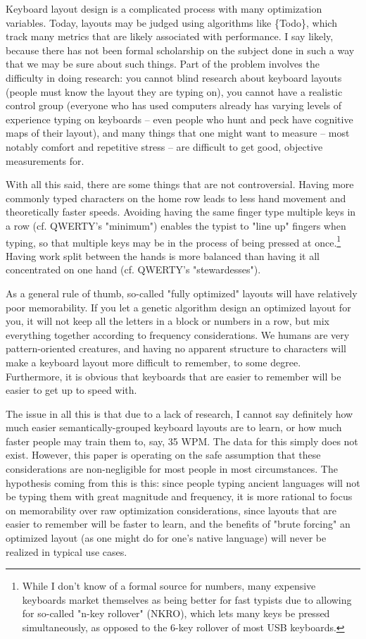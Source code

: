 \documentclass[11pt]{article}
\begin{document}
Keyboard layout design is a complicated process with many optimization variables. Today, layouts may be judged using algorithms like \{Todo\}, which track many metrics that are likely associated with performance. I say likely, because there has not been formal scholarship on the subject done in such a way that we may be sure about such things. Part of the problem involves the difficulty in doing research: you cannot blind research about keyboard layouts (people must know the layout they are typing on), you cannot have a realistic control group (everyone who has used computers already has varying levels of experience typing on keyboards -- even people who hunt and peck have cognitive maps of their layout), and many things that one might want to measure -- most notably comfort and repetitive stress -- are difficult to get good, objective measurements for.

With all this said, there are some things that are not controversial. Having more commonly typed characters on the home row leads to less hand movement and theoretically faster speeds. Avoiding having the same finger type multiple keys in a row (cf. QWERTY's "minimum") enables the typist to "line up" fingers when typing, so that multiple keys may be in the process of being pressed at once.\footnote{While I don't know of a formal source for numbers, many expensive keyboards market themselves as being better for fast typists due to allowing for so-called "n-key rollover" (NKRO), which lets many keys be pressed simultaneously, as opposed to the 6-key rollover of most USB keyboards.} Having work split between the hands is more balanced than having it all concentrated on one hand (cf. QWERTY's "stewardesses").

As a general rule of thumb, so-called "fully optimized" layouts will have relatively poor memorability. If you let a genetic algorithm design an optimized layout for you, it will not keep all the letters in a block or numbers in a row, but mix everything together according to frequency considerations. We humans are very pattern-oriented creatures, and having no apparent structure to characters will make a keyboard layout more difficult to remember, to some degree. Furthermore, it is obvious that keyboards that are easier to remember will be easier to get up to speed with.

The issue in all this is that due to a lack of research, I cannot say definitely how much easier semantically-grouped keyboard layouts are to learn, or how much faster people may train them to, say, 35 WPM. The data for this simply does not exist. However, this paper is operating on the safe assumption that these considerations are non-negligible for most people in most circumstances. The hypothesis coming from this is this: since people typing ancient languages will not be typing them with great magnitude and frequency, it is more rational to focus on memorability over raw optimization considerations, since layouts that are easier to remember will be faster to learn, and the benefits of "brute forcing" an optimized layout (as one might do for one's native language) will never be realized in typical use cases.
\end{document}
